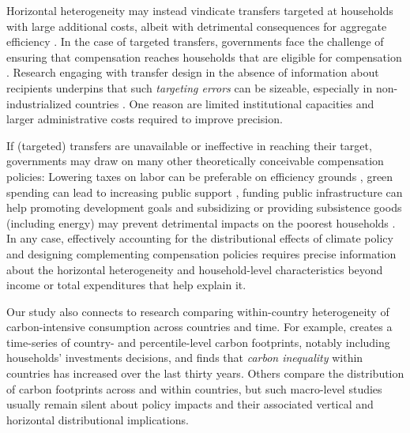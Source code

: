 \documentclass[12pt, a4paper]{article}
\begin{document}
Horizontal heterogeneity may instead vindicate transfers targeted at households with large additional costs, albeit with detrimental consequences for aggregate efficiency \autocite{Hansel.2022}. In the case of targeted transfers, governments face the challenge of ensuring that compensation reaches households that are eligible for compensation \autocite[e.g.][]{Hanna.2018}. Research engaging with transfer design in the absence of information about recipients underpins that such \textit{targeting errors} can be sizeable, especially in non-industrialized countries \autocite{WorldBank.2018, Robles.2019}. One reason are limited institutional capacities \autocite[e.g.][]{Besley.2009} and larger administrative costs \autocite{Coady.2004} required to improve precision.

If (targeted) transfers are unavailable or ineffective in reaching their target, governments may draw on many other theoretically conceivable compensation policies: Lowering taxes on labor can be preferable on efficiency grounds \autocite{Pearce.1991,Goulder.1995,Bento.2018}, green spending can lead to increasing public support \autocite{Sommer.2022,Kotchen.2017,Dechezlepretre.2022}, funding public infrastructure can help promoting development goals \autocite{Franks.2018,Jakob.2016} and subsidizing or providing subsistence goods (including energy) may prevent detrimental impacts on the poorest households \autocite{Greve.2022,Schaffitzel.2019}. In any case, effectively accounting for the distributional effects of climate policy and designing complementing compensation policies requires precise information about the horizontal heterogeneity and household-level characteristics beyond income or total expenditures that help explain it. 

Our study also connects to research comparing within-country heterogeneity of carbon-intensive consumption across countries and time. For example, \textcite{Chancel.2022b} creates a time-series of country- and percentile-level carbon footprints, notably including households' investments decisions, and finds that \textit{carbon inequality} within countries has increased over the last thirty years. Others \autocite{Oswald.2020,Bruckner.2022} compare the distribution of carbon footprints across and within countries, but such macro-level studies usually remain silent about policy impacts and their associated vertical and horizontal distributional implications.
\end{document}
